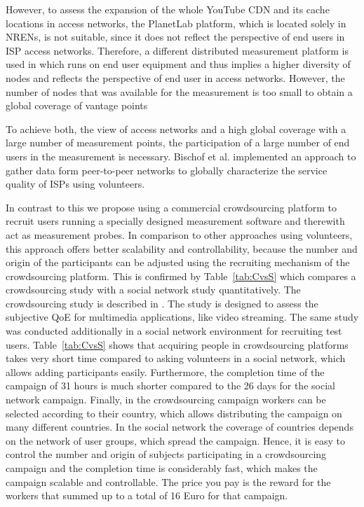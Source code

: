 However, to assess the expansion of the whole YouTube CDN and its cache locations in access networks, the PlanetLab platform, which is located solely in NRENs, is not suitable, since it does not reflect the perspective of end users in ISP access networks.
Therefore, a different distributed measurement platform is used in \cite{rafetseder2011exploring} which runs on end user equipment and thus implies a higher diversity of nodes and reflects the perspective of end user in access networks.
However, the number of nodes that was available for the measurement is too small to obtain a global coverage of vantage points

To achieve both, the view of access networks and a high global coverage with a large number of measurement points, the participation of a large number of end users in the measurement is necessary.
Bischof et al. \cite{bischof2011crowdsourcing} implemented an approach to gather data form peer-to-peer networks to globally characterize the service quality of ISPs using volunteers.

In contrast to this we propose using a commercial crowdsourcing platform to recruit users running a specially designed measurement software and therewith act as measurement probes.
In comparison to other approaches using volunteers, this approach offers better scalability and controllability, because the number and origin of the participants can be adjusted using the recruiting mechanism of the crowdsourcing platform.
This is confirmed by Table~\ref{tab:CvsS} which compares a crowdsourcing study with a social network study quantitatively. The crowdsourcing study  is described in \cite{bookchapter2013-18}. The study is designed to assess the subjective QoE for multimedia applications, like video streaming.
The same study was conducted additionally in a social network environment for recruiting test users.
Table~\ref{tab:CvsS} shows that acquiring people in crowdsourcing platforms takes very short time compared to asking volunteers in a social network, which allows adding participants easily.
Furthermore, the completion time of the campaign of 31 hours is much shorter compared to the 26 days for the social network campaign.
Finally, in the crowdsourcing campaign workers can be selected according to their country, which allows distributing the campaign on many different countries. In the social network the coverage of countries depends on the network of user groups, which spread the campaign.
Hence, it is easy to control the number and origin of subjects participating in a crowdsourcing campaign and the completion time is considerably fast, which makes the campaign scalable and controllable. The price you pay is the reward for the workers that summed up to a total of 16 Euro for that campaign.

